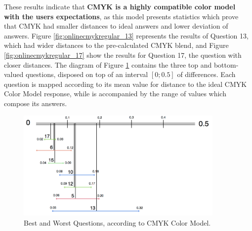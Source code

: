 %
These results indicate that \textbf{CMYK is a highly compatible color model with the users expectations}, as this model presents statistics which prove that CMYK had smaller distances to ideal answers and lower deviation of answers.
Figure \ref{fig:onlinecmykregular_13} represents the results of Question 13, which had wider distances to the pre-calculated CMYK blend, and Figure \ref{fig:onlinecmykregular_17} show the results for Question 17, the question with closer
distances. The diagram of Figure \ref{fig:cmyk_analysis} contains the three top and bottom-valued questions, disposed on top of an interval $[0 ; 0.5]$ of differences. Each question is mapped according to its mean value for
distance to the ideal CMYK Color Model response, while is accompanied by the range of values which compose its answers. \par
%
\begin{figure}[!htbp]
  \centering
  \includegraphics[width=0.9\textwidth]{images/cmyk_questions_analysis.png}
  \caption[Best and Worst Questions, according to CMYK Color Model.]{Best and Worst Questions, according to CMYK Color Model.}
  \label{fig:cmyk_analysis}
\end{figure}
%
%
